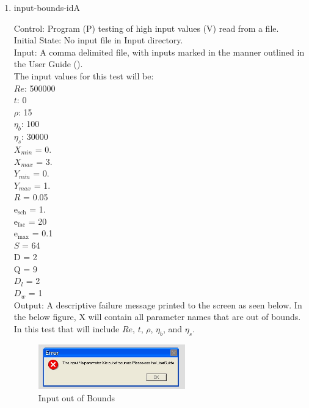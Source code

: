 \documentclass[12pt, titlepage]{article}
\newcounter{testcounter} %
\begin{document}
\begin{enumerate}			
					
\item{input-bounds-id\thetestcounter A \label{inputboundstest}\\}

Control: Program (P) testing of high input values (V) read from a file.\\
					
Initial State: No input file in Input directory.\\
					
Input: A comma delimited file, with inputs marked in the manner outlined in the
User Guide (\citet{LBM_UserGuide_PM}).\\The input values for this test will
be:\\$Re$: 500000\\
$t$: 0\\
$\rho$: 15\\
$\eta_b$: 100\\
$\eta_s$: 30000\\
$X_{min}$ = 0.\\
$X_{max}$ = 3.\\
$Y_{min}$ = 0.\\
$Y_{max}$ = 1.\\
$R$ = 0.05\\
$\mathrm{e_{sch}}$ = 1.\\
$\mathrm{e_{fac}}$ = 20\\
$\mathrm{e_{max}}$ = 0.1\\
$S$ = 64\\
$\mathrm{D}$ = 2\\
$\mathrm{Q}$ = 9\\
$D_{l}$ = 2\\
$D_{w}$ = 1\\
	
Output: A descriptive failure message printed to the screen as seen below. In
the below figure, X will contain all parameter names that are out of bounds. In
this test that will include $Re$, $t$, $\rho$, $\eta_b$, and $\eta_s$.

\begin{figure}[h!]
\begin{center}
\includegraphics[width=0.6\textwidth]{errorMessage.jpeg}
\caption{Input out of Bounds}
\label{Fig_InputError}
\end{center}
\end{figure}


\end{enumerate}
\end{document}
